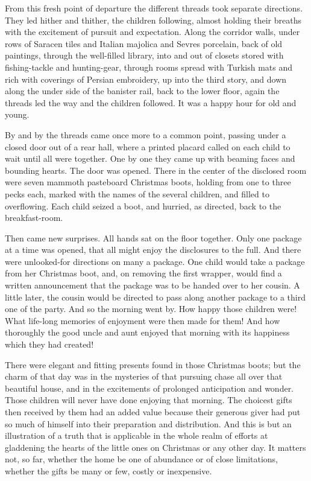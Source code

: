 \documentclass[
]{book}
\begin{document}
From this fresh point of departure the different threads took separate directions. They led hither and thither, the children following, almost holding their breaths with the excitement of pursuit and expectation. Along the corridor walls, under rows of Saracen tiles and Italian majolica and Sevres porcelain, back of old paintings, through the well-filled library, into and out of closets stored with fishing-tackle and hunting-gear, through rooms spread with Turkish mats and rich with coverings of Persian embroidery, up into the third story, and down along the under side of the banister rail, back to the lower floor, again the threads led the way and the children followed. It was a happy hour for old and young.

By and by the threads came once more to a common point, passing under a closed door out of a rear hall, where a printed placard called on each child to wait until all were together. One by one they came up with beaming faces and bounding hearts. The door was opened. There in the center of the disclosed room were seven mammoth pasteboard Christmas boots, holding from one to three pecks each, marked with the names of the several children, and filled to overflowing. Each child seized a boot, and hurried, as directed, back to the breakfast-room.

Then came new surprises. All hands sat on the floor together. Only one package at a time was opened, that all might enjoy the disclosures to the full. And there were unlooked-for directions on many a package. One child would take a package from her Christmas boot, and, on removing the first wrapper, would find a written announcement that the package was to be handed over to her cousin. A little later, the cousin would be directed to pass along another package to a third one of the party. And so the morning went by. How happy those children were! What life-long memories of enjoyment were then made for them! And how thoroughly the good uncle and aunt enjoyed that morning with its happiness which they had created!

There were elegant and fitting presents found in those Christmas boots; but the charm of that day was in the mysteries of that pursuing chase all over that beautiful house, and in the excitements of prolonged anticipation and wonder. Those children will never have done enjoying that morning. The choicest gifts then received by them had an added value because their generous giver had put so much of himself into their preparation and distribution. And this is but an illustration of a truth that is applicable in the whole realm of efforts at gladdening the hearts of the little ones on Christmas or any other day. It matters not, so far, whether the home be one of abundance or of close limitations, whether the gifts be many or few, costly or inexpensive.
\end{document}
